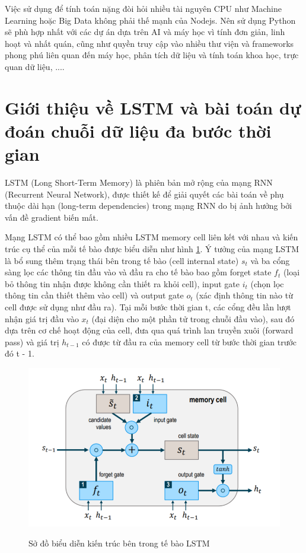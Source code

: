 Việc sử dụng để tính toán nặng đòi hỏi nhiều tài nguyên CPU như Machine Learning hoặc Big Data không phải thế mạnh của Nodejs. Nên sử dụng Python sẽ phù hợp nhất với các dự án dựa trên AI và máy học vì tính đơn giản, linh hoạt và nhất quán, cũng như quyền truy cập vào nhiều thư viện và frameworks phong phú liên quan đến máy học, phân tích dữ liệu và tính toán khoa học, trực quan dữ liệu, ....

\section{Giới thiệu về LSTM và bài toán dự đoán chuỗi dữ liệu đa bước thời gian}
LSTM (Long Short-Term Memory) là phiên bản mở rộng của mạng RNN (Recurrent Neural Network), được thiết kế để giải quyết các bài toán về phụ thuộc dài hạn (long-term dependencies) trong mạng RNN do bị ảnh hưởng bởi vấn đề gradient biến mất.

Mạng LSTM có thể bao gồm nhiều LSTM memory cell liên kết với nhau và kiến trúc cụ thể của mỗi tế bào được biểu diễn như hình \ref{tab.lstm_cell}. Ý tưởng của mạng LSTM là bổ sung thêm trạng thái bên trong tế bào (cell internal state) $s_t$ và ba cổng sàng lọc các thông tin đầu vào và đầu ra cho tế bào bao gồm forget state $f_t$ (loại bỏ thông tin nhận được không cần thiết ra khỏi cell), input gate $i_t$ (chọn lọc thông tin cần thiết thêm vào cell) và output gate $o_t$ (xác định thông tin nào từ cell được sử dụng như đầu ra). Tại mỗi bước thời gian t, các cổng đều lần lượt nhận giá trị đầu vào $x_t$ (đại diện cho một phần tử trong chuỗi đầu vào), sau đó dựa trên cơ chế hoạt động của cell, đưa qua quá trình lan truyền xuôi (forward pass) và giá trị $h_{t-1}$ có được từ đầu ra của memory cell từ bước thời gian trước đó t - 1.

\begin{figure}[H]
    \includegraphics[width=\textwidth]{images/Khanh/Python/LSTM_cell_structure.PNG}
    \caption{Sở đồ biểu diễn kiến trúc bên trong tế bào LSTM} \cite{lstmintroduction}
    \label{tab.lstm_cell}
\end{figure}

